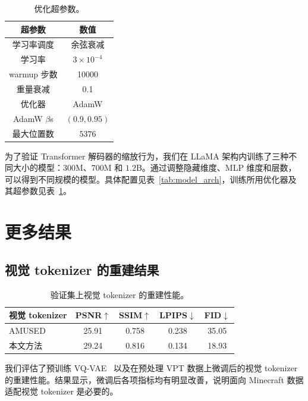 \documentclass{article} %
\begin{document}
\begin{table}[htbp]
    \centering
    \caption{优化超参数。}
    \begin{tabular}{c|c}
        \toprule[1pt]
       \textbf{超参数}  &  \textbf{数值} \\
       \midrule
       学习率调度&余弦衰减\\
       学习率& $3\times10^{-4}$ \\
       warmup 步数& 10000 \\
       重量衰减& 0.1 \\
       优化器&AdamW\\
       AdamW $\beta$s& $(0.9, 0.95)$ \\
       最大位置数& $5376$ \\
       \bottomrule[1pt]
    \end{tabular}
    \label{tab:hyperparams}
\end{table}

为了验证 Transformer 解码器的缩放行为，我们在 LLaMA 架构内训练了三种不同大小的模型：$300$M、$700$M 和 $1.2$B。通过调整隐藏维度、MLP 维度和层数，可以得到不同规模的模型。具体配置见表~\ref{tab:model_arch}，训练所用优化器及其超参数见表~\ref{tab:hyperparams}。

\section{更多结果}
\label{app:more_results}

\subsection{视觉 tokenizer 的重建结果}

\begin{table}[htbp]
\begin{center}
\footnotesize
\caption{验证集上视觉 tokenizer 的重建性能。}
	\label{tab:visual_tokenizer}
        \setlength\tabcolsep{8pt}
        \renewcommand\arraystretch{1.1}
	\begin{tabular}{l|cccc}
		\toprule[1pt]
		视觉 tokenizer&PSNR$\uparrow$ &SSIM$\uparrow$ &LPIPS$\downarrow$ &FID$\downarrow$ \\
		\midrule
		AMUSED~\citep{patil2024amused} & 25.91 & 0.758 & 0.238 & 35.05 \\
        本文方法& 29.24 & 0.816 & 0.134 & 18.93 \\
		\bottomrule[1pt]
	\end{tabular}
\end{center}
\end{table}

我们评估了预训练 VQ-VAE~\citep{patil2024amused} 以及在预处理 VPT 数据上微调后的视觉 tokenizer 的重建性能。结果显示，微调后各项指标均有明显改善，说明面向 Minecraft 数据适配视觉 tokenizer 是必要的。
\end{document}
